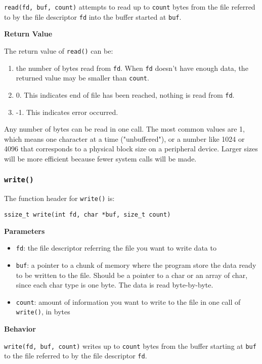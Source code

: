 \documentclass[12pt]{article}
\begin{document}
\texttt{read(fd, buf, count)} attempts to read up to \texttt{count} bytes from the file referred to by the file descriptor \texttt{fd} into the buffer started at \texttt{buf}.

\textbf{Return Value}

The return value of \texttt{read()} can be:
\begin{enumerate}
\item the number of bytes read from \texttt{fd}. When \texttt{fd} doesn't have enough data, the returned value may be smaller than \texttt{count}.
\item 0. This indicates end of file has been reached, nothing is read from \texttt{fd}.
\item -1. This indicates error occurred.
\end{enumerate}

Any number of bytes can be read in one call. The most common values are 1, which means one character at a time ("unbuffered"), or a number like 1024 or 4096 that corresponds to a physical block size on a peripheral device. Larger sizes will be more efficient because fewer system calls will be made.
\subsubsection{\texttt{write()}}
\label{sec:orgc377666}
The function header for \texttt{write()} is:
\begin{verbatim}
ssize_t write(int fd, char *buf, size_t count)
\end{verbatim}

\textbf{Parameters}

\begin{itemize}
\item \texttt{fd}: the file descriptor referring the file you want to write data to
\item \texttt{buf}: a pointer to a chunk of memory where the program store the data ready to be written to the file. Should be a pointer to a char or an array of char, since each char type is one byte. The data is read byte-by-byte.
\item \texttt{count}: amount of information you want to write to the file in one call of \texttt{write()}, in bytes
\end{itemize}

\textbf{Behavior}

\texttt{write(fd, buf, count)} writes up to \texttt{count} bytes from the buffer starting at \texttt{buf} to the file referred to by the file descriptor \texttt{fd}.
\end{document}
